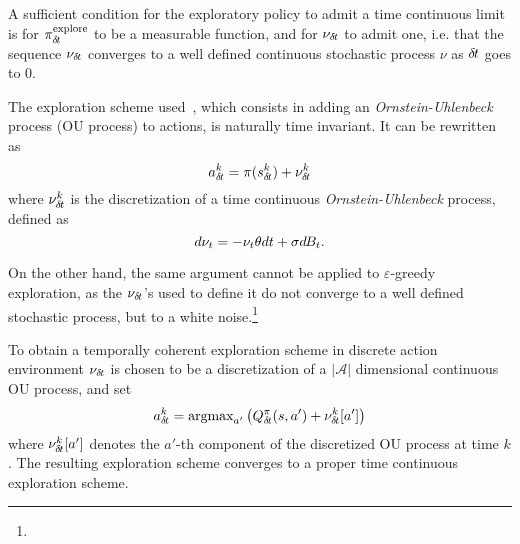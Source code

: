  A sufficient condition for the exploratory policy to admit a time continuous
limit is for $\pi^\text{explore}_{\delta\hspace{-.1em}t}$ to be a measurable function, and for
$\nu_{\delta\hspace{-.1em}t}$ to admit one, i.e. that the sequence $\nu_{\delta\hspace{-.1em}t}$ converges to a
well defined continuous stochastic process $\nu$ as ${\delta\hspace{-.1em}t}$ goes to $0$.

The exploration scheme used~\cite{ddpg}, which consists in adding an
\emph{Ornstein-Uhlenbeck}~\cite{orn-uhl} process (OU process) to actions, is naturally time
invariant. It can be rewritten as
\begin{equation}
	a^k_{\delta\hspace{-.1em}t} = \pi(s^k_{\delta\hspace{-.1em}t}) + \nu^k_{\delta\hspace{-.1em}t}
\end{equation}
where $\nu^k_{\delta\hspace{-.1em}t}$ is the discretization of a time continuous \emph{Ornstein-Uhlenbeck}
process, defined as
\begin{equation}
	d\nu_t = - \nu_t \theta dt + \sigma d\hspace{-.1em}B_t.
	\label{eq:orn_uhl}
\end{equation}

On the other hand, the same argument cannot be applied to $\varepsilon$-greedy
exploration, as the $\nu_{\delta\hspace{-.1em}t}$'s used to define it do not converge to a 
well defined stochastic process, but to a white noise.\footnote{}

To obtain a temporally coherent exploration scheme in discrete action environment
$\nu_{\delta\hspace{-.1em}t}$ is chosen to be a discretization of a $|\mathcal{A}|$ dimensional
continuous OU process, and set
\begin{equation}
	a^k_{\delta\hspace{-.1em}t} = \text{argmax}_{a'} \left(Q^\pi_{\delta\hspace{-.1em}t}(s, a') + \nu_{\delta\hspace{-.1em}t}^k[a']\right)
\end{equation}
where $\nu_{\delta\hspace{-.1em}t}^k[a']$ denotes the $a'$-th component of the discretized OU process at time
$k$. The resulting exploration scheme converges to a proper time continuous exploration scheme.

